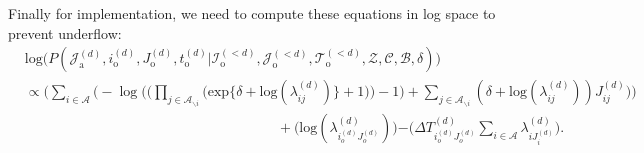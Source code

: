 \documentclass[a4paper]{article}
\begin{document}
  	       Finally for implementation, we need to compute these equations in log space to prevent underflow:
  	       \begin{equation}
  	       \begin{aligned}
  	       &\mbox{log}\Big(P(\mathcal{J}^{(d)}_{\mbox{a}}, i^{(d)}_{\mbox{o}}, J^{(d)}_{\mbox{o}}, t^{(d)}_{\mbox{o}} |\mathcal{I}^{(<d)}_{\mbox{o}}, \mathcal{J}^{(<d)}_{\mbox{o}}, \mathcal{T}^{(<d)}_{\mbox{o}}, \mathcal{Z}, \mathcal{C}, \mathcal{B},  \delta)\Big)\\&\propto \Big(\sum_{i\in \mathcal{A}}\Big(-\log\Big(\Big(\prod_{j \in \mathcal{A}_{\backslash i}} \Big(\mbox{exp}\{\delta+\mbox{log}(\lambda_{ij}^{(d)})\} + 1\Big)\Big)-1\Big) + \sum_{j \in \mathcal{A}_{\backslash i}} (\delta+\mbox{log}(\lambda_{ij}^{(d)}))J_{ij}^{(d)}\Big)\Big)\\&\quad\quad\quad\quad\quad\quad\quad\quad\quad\quad\quad\quad\quad\quad\quad\quad\quad\quad +  \Big(\mbox{log}(\lambda^{(d)}_{i_o^{(d)}J_o^{(d)}})\Big){ - \Big(\Delta T^{(d)}_{i_o^{(d)}J_o^{(d)}}\sum\limits_{i \in \mathcal{A}}\lambda^{(d)}_{i{J_i^{(d)}}}}\Big).
  	       \end{aligned}
  	       \end{equation}
\end{document}
